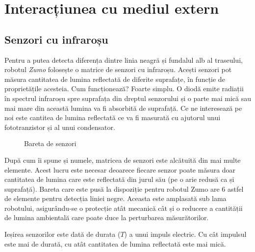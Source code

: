 \chapter{Interacțiunea cu mediul extern}

\section{Senzori cu infraroșu}

Pentru a putea detecta diferența dintre linia neagră și fundalul alb al traseului, robotul \textit{Zumo} folosește o matrice de senzori cu infraroșu. Acești senzori pot măsura cantitatea de lumina reflectată de diferite suprafațe, în funcție de proprietățile acesteia. Cum funcționează? Foarte simplu. O diodă emite radiații în spectrul infraroșu spre suprafața din dreptul senzorului și o parte mai mică sau mai mare din această lumina va fi absorbită de suprafață. Ce ne interesează pe noi este cantitea de lumina reflectată ce va fi masurată cu ajutorul unui fototranzistor și al unui condensator.

\begin{figure}
    \vspace{-20pt}
    \vspace{-15pt}
    \caption{\label{fig:CodeWarrior-InfraredSensors} Bareta de senzori}
    \vspace{-20pt}
\end{figure}

După cum îi spune și numele, matricea de senzori este alcătuită din mai multe elemente. Acest lucru este necesar deoarece fiecare senzor poate măsura doar cantitatea de lumina care este reflectată din jurul său (pe o arie redusă ca și suprafață). Bareta care este pusă la dispoziție pentru robotul Zumo are 6 astfel de elemente pentru detecția liniei negre. Aceasta este amplasată sub lama robotului, asigurându-se o protecție atât mecanică cât și o reducere a cantității de lumina ambientală care poate duce la perturbarea măsurătorilor.

Ieșirea senzorilor este dată de durata ($T$) a unui impuls electric. Cu cât impulsul este mai de durată, cu atât cantitatea de lumina reflectată este mai mică.

